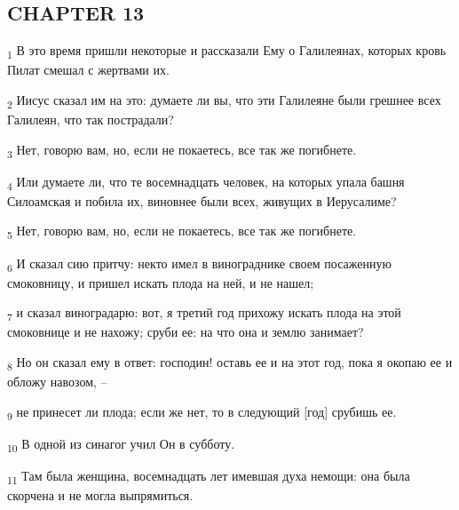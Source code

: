 \subsection{CHAPTER 13}
\begin{tcolorbox}
\textsubscript{1} В это время пришли некоторые и рассказали Ему о Галилеянах, которых кровь Пилат смешал с жертвами их.
\end{tcolorbox}
\begin{tcolorbox}
\textsubscript{2} Иисус сказал им на это: думаете ли вы, что эти Галилеяне были грешнее всех Галилеян, что так пострадали?
\end{tcolorbox}
\begin{tcolorbox}
\textsubscript{3} Нет, говорю вам, но, если не покаетесь, все так же погибнете.
\end{tcolorbox}
\begin{tcolorbox}
\textsubscript{4} Или думаете ли, что те восемнадцать человек, на которых упала башня Силоамская и побила их, виновнее были всех, живущих в Иерусалиме?
\end{tcolorbox}
\begin{tcolorbox}
\textsubscript{5} Нет, говорю вам, но, если не покаетесь, все так же погибнете.
\end{tcolorbox}
\begin{tcolorbox}
\textsubscript{6} И сказал сию притчу: некто имел в винограднике своем посаженную смоковницу, и пришел искать плода на ней, и не нашел;
\end{tcolorbox}
\begin{tcolorbox}
\textsubscript{7} и сказал виноградарю: вот, я третий год прихожу искать плода на этой смоковнице и не нахожу; сруби ее: на что она и землю занимает?
\end{tcolorbox}
\begin{tcolorbox}
\textsubscript{8} Но он сказал ему в ответ: господин! оставь ее и на этот год, пока я окопаю ее и обложу навозом, --
\end{tcolorbox}
\begin{tcolorbox}
\textsubscript{9} не принесет ли плода; если же нет, то в следующий [год] срубишь ее.
\end{tcolorbox}
\begin{tcolorbox}
\textsubscript{10} В одной из синагог учил Он в субботу.
\end{tcolorbox}
\begin{tcolorbox}
\textsubscript{11} Там была женщина, восемнадцать лет имевшая духа немощи: она была скорчена и не могла выпрямиться.
\end{tcolorbox}
